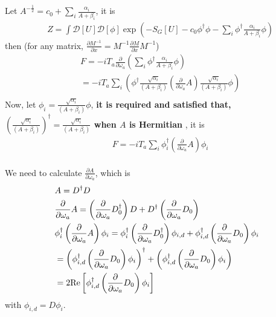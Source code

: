 Let $A^{-\frac{1}{2}}=c_0+\sum _i \frac{\alpha _i }{A+\beta _i} $, it is
\begin{equation}
\begin{split}
&Z=\int \mathcal{D}[U]  \mathcal {D}[\phi]\exp \left(-S_G[U]-c_0\phi ^{\dagger} \phi -\sum_i \phi ^{\dagger}\frac{\alpha _i }{A+\beta _i} \phi\right)
\end{split}
\end{equation}
then (for any matrix, $\frac{\partial M^{-1}}{\partial x} = M^{-1}\frac{\partial M}{\partial x} M^{-1}$)
\begin{equation}
\begin{split}
&F=-iT_a \frac{\partial }{\partial \omega _a}\left(\sum_i \phi ^{\dagger}\frac{\alpha _i }{A+\beta _i} \phi\right)\\
&=-iT_a \sum_i \left(\phi ^{\dagger}\frac{\sqrt{\alpha _i} }{(A+\beta _i)} \left(\frac{\partial }{\partial \omega _a} A \right) \frac{\sqrt{\alpha _i} }{(A+\beta _i)} \phi\right)\\
\end{split}
\end{equation}
Now, let $\phi _{i} =  \frac{\sqrt{\alpha _i} }{(A+\beta _i)} \phi$, \textbf{\textcolor[rgb]{1,0,0}{it is required and satisfied that, $\left(\frac{\sqrt{\alpha _i} }{(A+\beta _i)} \right)^{\dagger}=\frac{\sqrt{\alpha _i} }{(A+\beta _i)} $ when $A$ is Hermitian} }, it is
\begin{equation}
\begin{split}
&F=-iT_a \sum _i \phi _{i}^{\dagger} \left(\frac{\partial }{\partial \omega _a} A \right) \phi _{i}\\
\end{split}
\end{equation}

We need to calculate $\frac{\partial A}{\partial \omega _a}$, which is
\begin{equation}
\begin{split}
&A=D^{\dagger}D\\
&\frac{\partial }{\partial \omega _a}A = \left(\frac{\partial }{\partial \omega _a}D^{\dagger}_{0}\right)D+D^{\dagger}\left(\frac{\partial }{\partial \omega _a}D_{0}\right)\\
&\phi _i^{\dagger}\left(\frac{\partial }{\partial \omega _a}A\right)\phi _i=\phi _i^{\dagger}\left(\frac{\partial }{\partial \omega _a}D^{\dagger}_{0}\right)\phi _{i,d}+\phi _{i,d}^{\dagger}\left(\frac{\partial }{\partial \omega _a}D_{0}\right)\phi _i\\
&=\left(\phi _{i,d}^{\dagger}\left(\frac{\partial }{\partial \omega _a}D_{0}\right)\phi _i\right)^{\dagger}+\left(\phi _{i,d}^{\dagger}\left(\frac{\partial }{\partial \omega _a}D_{0}\right)\phi _i\right)\\
&=2{\rm Re}\left[\phi _{i,d}^{\dagger}\left(\frac{\partial }{\partial \omega _a}D_{0}\right)\phi _i\right]
\end{split}
\end{equation}
with $\phi _{i,d}=D\phi _i$.

